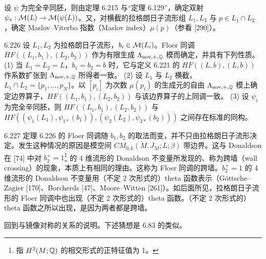 
设 $\psi$ 为完全辛同胚，则由定理 6.215 与“定理 6.129”，确定双射 $\psi_*:\mathcal{M}(L)\to\mathcal{M}(\psi(L))$。又，对横截的拉格朗日子流形组 $L_1,L_2$ 与 $p\in L_1\cap L_2$，确定 Maslov–Viterbo 指数（Maslov index）$\mu(p)$（参看 [290]）。

\begin{theorem}{6.226}
  设 $L_1,L_2$ 为拉格朗日子流形，$b_i\in\mathcal{M}(L_i)$。Floer 同调 $HF((L_1,b_1),(L_2,b_2))$ 作为有限生成 $\Lambda_{\mathrm{nov},+,\mathbb{Q}}$ 模而确定，并具有下列性质。
  (1) 当 $L_1=L_2=L$，$b_1=b_2=b$ 时，它与定义 6.221 的 $HF((L,b),(L,b))$ 作系数扩张到 $\Lambda_{\mathrm{nov},+,\mathbb{Q}}$ 所得者一致。
  (2) 设 $L_1$ 与 $L_2$ 横截，$L_1\cap L_2=\{p_1,\dots,p_N\}$。以 $[p_i]$ 为次数 $\mu(p_i)$ 的生成元的自由 $\Lambda_{\mathrm{nov},+,\mathbb{Q}}$ 模上确定边界算子，$HF((L_1,b_1),(L_2,b_2))$ 与该边界算子的上同调一致。
  (3) 设 $\psi_i$ 为完全辛同胚，则 $HF((L_1,b_1),(L_2,b_2))$ 与 $HF((\psi_1(L_1),\psi_{1*}(b_1)),(\psi_2(L_2),\psi_{2*}(b_2)))$ 之间存在标准的同构。
\end{theorem}

\begin{remark}{6.227}
  定理 6.226 的 Floer 同调随 $b_1,b_2$ 的取法而变，并不只由拉格朗日子流形决定。发生这种情况的原因是模空间 $CM_{0,k}(M,J_M;L;\beta)$ 带边界。这与 Donaldson 在 [74] 中对 $b_2^+=1$\footnote{指 $H^2(M;\mathbb{Q})$ 的相交形式的正特征值为 1。} 的 4 维流形的 Donaldson 不变量所发现的、称为跨墙（wall crossing）的现象，本质上有相同的理由。这称为 Floer 同调的跨墙。$b_2^+=1$ 的 4 维流形的 Donaldson 不变量用（不定 2 次形式的）theta 函数表示（Göttsche–Zagier [170]、Borcherds [47]、Moore–Witten [261]）。如后面所见，拉格朗日子流形的 Floer 同调中也出现（不定 2 次形式的）theta 函数。（不定 2 次形式的）theta 函数之所以出现，是因为两者都是跨墙。
\end{remark}

回到与镜像对称的关系的说明。下述猜想是 6.83 的类似。

